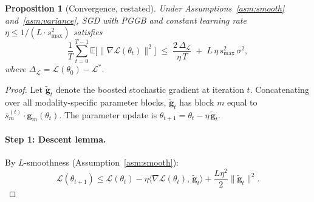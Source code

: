 \documentclass{article} %
\newtheorem{proposition}{Proposition}
\newcommand{\loss}{\mathcal{L}}
\begin{document}
\begin{proposition}[Convergence, restated]
Under Assumptions~\ref{asm:smooth} and~\ref{asm:variance}, SGD with PGGB and constant learning rate $\eta \leq 1/(L \cdot s_{\max}^2)$ satisfies
%
\begin{equation*}
\frac{1}{T}\sum_{t=0}^{T-1} \mathbb{E}\bigl[\|\nabla \loss(\theta_t)\|^2\bigr]
\;\leq\; \frac{2\,\Delta_{\loss}}{\eta\, T} \;+\; L\,\eta\, s_{\max}^2\, \sigma^2,
\end{equation*}
%
where $\Delta_{\loss} = \loss(\theta_0) - \loss^{*}$.
\end{proposition}

\begin{proof}
Let $\tilde{\mathbf{g}}_t$ denote the boosted stochastic gradient at iteration $t$. Concatenating over all modality-specific parameter blocks, $\tilde{\mathbf{g}}_t$ has block $m$ equal to $\bar{s}_m^{(t)} \cdot \mathbf{g}_m(\theta_t)$. The parameter update is $\theta_{t+1} = \theta_t - \eta\,\tilde{\mathbf{g}}_t$.

\paragraph{Step 1: Descent lemma.}
By $L$-smoothness (Assumption~\ref{asm:smooth}):
%
\begin{equation}
\label{eq:descent}
\loss(\theta_{t+1}) \leq \loss(\theta_t) - \eta \langle \nabla \loss(\theta_t),\, \tilde{\mathbf{g}}_t \rangle + \frac{L\eta^2}{2}\|\tilde{\mathbf{g}}_t\|^2.
\end{equation}


\end{proof}
\end{document}
